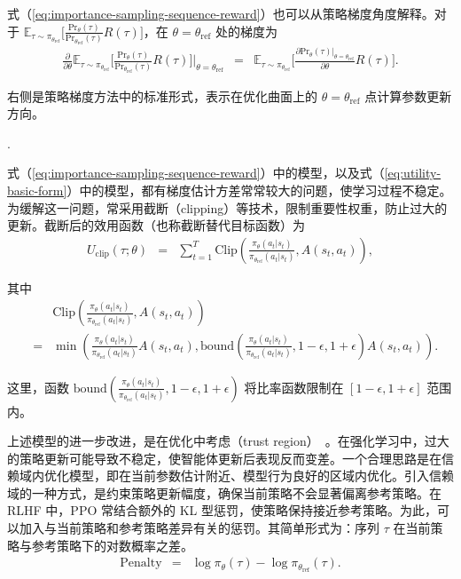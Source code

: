 {式（\ref{eq:importance-sampling-sequence-reward}）也可以从策略梯度角度解释。对于 $\mathbb{E}_{\tau \sim \pi_{\theta_{\mathrm{ref}}}} \Big[ \frac{\mathrm{Pr}_{\theta}(\tau)}{\mathrm{Pr}_{\theta_{\mathrm{ref}}}(\tau)} R(\tau) \Big]$，在 $\theta=\theta_{\mathrm{ref}}$ 处的梯度为
\begin{eqnarray}
\frac{\partial}{\partial \theta} \mathbb{E}_{\tau \sim \pi_{\theta_{\mathrm{ref}}}} \Big[ \frac{\mathrm{Pr}_{\theta}(\tau)}{\mathrm{Pr}_{\theta_{\mathrm{ref}}}(\tau)} R(\tau) \Big] \Big |_{\theta = \theta_{\mathrm{ref}}} & = & \mathbb{E}_{\tau \sim \pi_{\theta_{\mathrm{ref}}}} \Big[ \frac{\partial \mathrm{Pr}_{\theta}(\tau) |_{\theta = \theta_{\mathrm{ref}}}}{\partial \theta} R(\tau) \Big].
\end{eqnarray}

右侧是策略梯度方法中的标准形式，表示在优化曲面上的 $\theta=\theta_{\mathrm{ref}}$ 点计算参数更新方向。
}.

式（\ref{eq:importance-sampling-sequence-reward}）中的模型，以及式（\ref{eq:utility-basic-form}）中的模型，都有梯度估计方差常常较大的问题，使学习过程不稳定。为缓解这一问题，常采用截断（clipping）等技术，限制重要性权重，防止过大的更新。截断后的效用函数（也称截断替代目标函数）为
\begin{eqnarray}
U_{\mathrm{clip}}(\tau;\theta) & = & \sum_{t=1}^{T} \mathrm{Clip}\left( \frac{\pi_{\theta}(a_t|s_t)}{\pi_{\theta_{\mathrm{ref}}}(a_t|s_t)}, A(s_t,a_t) \right),
\end{eqnarray}

\noindent 其中
\begin{eqnarray}
& & \mathrm{Clip}\left( \frac{\pi_{\theta}(a_t|s_t)}{\pi_{\theta_{\mathrm{ref}}}(a_t|s_t)}, A(s_t,a_t)\right) \nonumber \\
& = &  \min\left( \frac{\pi_{\theta}(a_t|s_t)}{\pi_{\theta_{\mathrm{ref}}}(a_t|s_t)} A(s_t,a_t),\mathrm{bound} \left(\frac{\pi_{\theta}(a_t|s_t)}{\pi_{\theta_{\mathrm{ref}}}(a_t|s_t)}, 1 - \epsilon, 1 + \epsilon \right) A(s_t,a_t) \right).
\end{eqnarray}

\noindent 这里，函数 $\mathrm{bound}(\frac{\pi_{\theta}(a_t|s_t)}{\pi_{\theta_{\mathrm{ref}}}(a_t|s_t)}, 1 - \epsilon, 1 + \epsilon)$ 将比率函数限制在 $[1-\epsilon, 1+\epsilon]$ 范围内。

上述模型的进一步改进，是在优化中考虑（trust region）~\cite{schulman-etal:2015trust}。在强化学习中，过大的策略更新可能导致不稳定，使智能体更新后表现反而变差。一个合理思路是在信赖域内优化模型，即在当前参数估计附近、模型行为良好的区域内优化。引入信赖域的一种方式，是约束策略更新幅度，确保当前策略不会显著偏离参考策略。在 RLHF 中，PPO 常结合额外的 KL 型惩罚，使策略保持接近参考策略。为此，可以加入与当前策略和参考策略差异有关的惩罚。其简单形式为：序列 $\tau$ 在当前策略与参考策略下的对数概率之差。
\begin{eqnarray}
\mathrm{Penalty} & = & \log \pi_{\theta}(\tau) - \log \pi_{\theta_{\mathrm{ref}}}(\tau).
\end{eqnarray}

